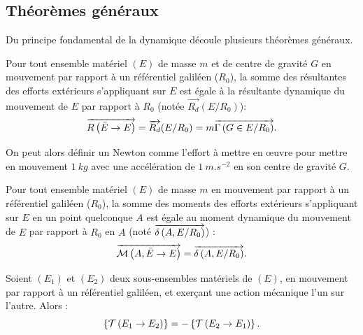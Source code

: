 \documentclass[10pt,fleqn]{article} %
\begin{document}
\subsection{Théorèmes généraux}

Du principe fondamental de la dynamique découle plusieurs théorèmes généraux.

\begin{theorem}
			Pour tout ensemble matériel $(E)$ de masse $m$ et de centre de gravité $G$ en mouvement par rapport à un référentiel galiléen ($R_0$), la somme des résultantes des efforts extérieurs s'appliquant sur $E$ est égale à la résultante dynamique du mouvement de $E$ par rapport à $R_0$ (notée $\overrightarrow{R_d}(E/R_0)$): 
$$\overrightarrow{R\left( {\bar E} \rightarrow {E}\right)}=\overrightarrow{R_d}(E/R_0)=m\overrightarrow{\Gamma \left( {G} \in {E}/{R_0}\right)}.$$
\end{theorem}

\begin{rem}
On peut alors définir un Newton comme l'effort à mettre en \oe{}uvre pour mettre en mouvement $\SI{1}{kg}$ avec une accélération de $\SI{1}{m.s^{-2}}$ en son centre de gravité $G$.
\end{rem}
\begin{theorem}
			Pour tout ensemble matériel $(E)$ de masse $m$ en mouvement par rapport à un référentiel galiléen ($R_0$), la somme des moments des efforts extérieurs s'appliquant sur $E$ en un point quelconque $A$ est égale au moment dynamique du mouvement de $E$ par rapport à $R_0$ en $A$ (noté $\overrightarrow{\delta \left( {A}, {E} /{R_0}\right)}$) : 
$$\overrightarrow{\mathcal{M}\left( {A}, {\bar E} \rightarrow {E}\right)}=\overrightarrow{\delta \left( {A}, {E} /{R_0}\right)}.$$
\end{theorem}

\begin{theorem}
Soient $(E_1)$ et $(E_2)$ deux sous-ensembles matériels de $(E)$,
en mouvement par rapport à un référentiel galiléen, et exerçant une action mécanique l'un sur l'autre. Alors :
	$$\left\{\mathcal{T} \left(E_1\rightarrow E_2 \right) \right\}=-\left\{\mathcal{T} \left(E_2\rightarrow E_1 \right) \right\}.$$
\end{theorem}
		
\end{document}
